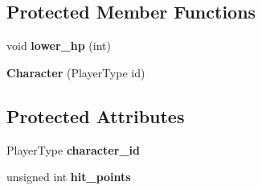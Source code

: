 \subsection*{Protected Member Functions}
\begin{DoxyCompactItemize}
\item 
\hypertarget{class_character_af859d7b80d7041535c55625ee8606a53}{void {\bfseries lower\-\_\-hp} (int)}\label{class_character_af859d7b80d7041535c55625ee8606a53}

\item 
\hypertarget{class_character_a48a3d7d8b856d6fc9d121b55f3b5acbd}{{\bfseries Character} (Player\-Type id)}\label{class_character_a48a3d7d8b856d6fc9d121b55f3b5acbd}

\end{DoxyCompactItemize}
\subsection*{Protected Attributes}
\begin{DoxyCompactItemize}
\item 
\hypertarget{class_character_a04a4d9685422d045c9069fc0defb018c}{Player\-Type {\bfseries character\-\_\-id}}\label{class_character_a04a4d9685422d045c9069fc0defb018c}

\item 
\hypertarget{class_character_a377ee5a771148b279410d5e009b8fdb7}{unsigned int {\bfseries hit\-\_\-points}}\label{class_character_a377ee5a771148b279410d5e009b8fdb7}

\end{DoxyCompactItemize}
